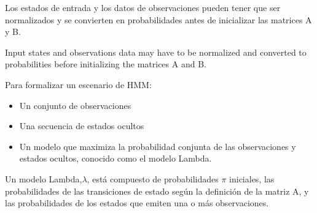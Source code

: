 Los estados de entrada y los datos de observaciones pueden tener que ser normalizados y se convierten en probabilidades antes de inicializar las matrices A y B.

Input states and observations data may have to be normalized and converted to probabilities before initializing the matrices A and B.




Para formalizar un escenario de HMM:

\begin{itemize}
	\item Un conjunto de observaciones
	\item Una secuencia de estados ocultos
	\item Un modelo que maximiza la probabilidad conjunta de las observaciones y estados ocultos, conocido como el modelo Lambda.

\end{itemize}


Un modelo Lambda,$\lambda$, está compuesto de probabilidades $\pi$ iniciales, las probabilidades de las transiciones de estado según la definición de la matriz A, y las probabilidades de los estados que emiten una o más observaciones.
















\vspace{1cm}



